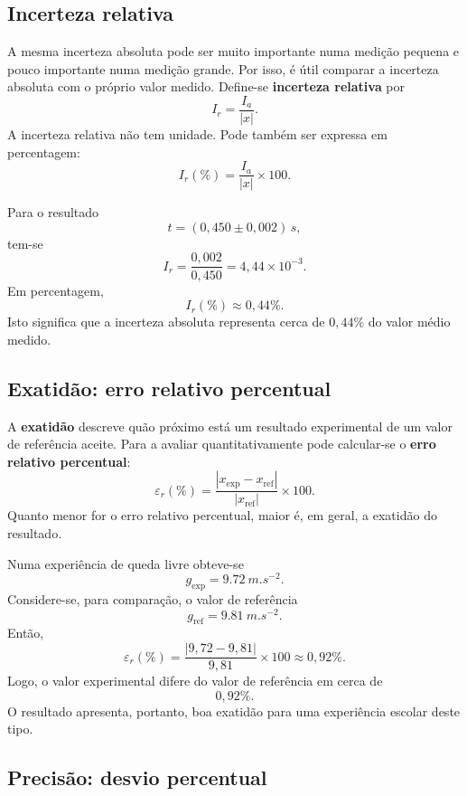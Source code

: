 \documentclass[11pt,a4paper,openany]{book}
\begin{document}
\subsection{Incerteza relativa}

A mesma incerteza absoluta pode ser muito importante numa medição pequena e pouco importante numa medição grande. Por isso, é útil comparar a incerteza absoluta com o próprio valor medido. Define-se \textbf{incerteza relativa} por
\[
\boxed{I_r=\frac{I_a}{|x|}}.
\]
A incerteza relativa não tem unidade. Pode também ser expressa em percentagem:
\[
\boxed{I_r(\%)=\frac{I_a}{|x|}\times100}.
\]

\begin{exemploresolvido}
Para o resultado
\[
t=(0,450\pm0,002)\,\si{s},
\]
tem-se
\[
I_r=\frac{0,002}{0,450}=4,44\times10^{-3}.
\]
Em percentagem,
\[
\boxed{I_r(\%)\approx0,44\%}.
\]
Isto significa que a incerteza absoluta representa cerca de $0,44\%$ do valor médio medido.
\end{exemploresolvido}

\subsection{Exatidão: erro relativo percentual}

A \textbf{exatidão} descreve quão próximo está um resultado experimental de um valor de referência aceite. Para a avaliar quantitativamente pode calcular-se o \textbf{erro relativo percentual}:
\[
\boxed{\varepsilon_r(\%)=\frac{|x_{\mathrm{exp}}-x_{\mathrm{ref}}|}{|x_{\mathrm{ref}}|}\times100}.
\]
Quanto menor for o erro relativo percentual, maior é, em geral, a exatidão do resultado.

\begin{exemploresolvido}
Numa experiência de queda livre obteve-se
\[
g_{\mathrm{exp}}=\SI{9.72}{m.s^{-2}}.
\]
Considere-se, para comparação, o valor de referência
\[
g_{\mathrm{ref}}=\SI{9.81}{m.s^{-2}}.
\]
Então,
\[
\varepsilon_r(\%)=
\frac{|9,72-9,81|}{9,81}\times100
\approx0,92\%.
\]
Logo, o valor experimental difere do valor de referência em cerca de
\[
\boxed{0,92\%}.
\]
O resultado apresenta, portanto, boa exatidão para uma experiência escolar deste tipo.
\end{exemploresolvido}

\subsection{Precisão: desvio percentual}
\end{document}
